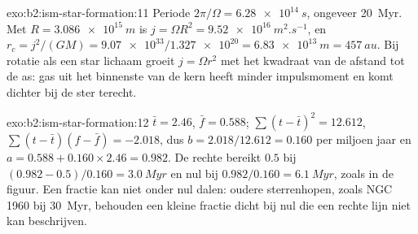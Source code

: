 \begin{solution}{exo:b2:ism-star-formation:11}
Periode $2\pi/\Omega = \qty{6.28e14}{s}$, ongeveer \qty{20}{Myr}. Met
$R = \qty{3.086e15}{m}$ is $j = \Omega R^2 = \qty{9.52e16}{m^2.s^{-1}}$, en
$r_c = j^2/(GM) = \num{9.07e33}/\num{1.327e20} = \qty{6.83e13}{m} = \qty{457}{au}$.
Bij rotatie als een star lichaam groeit $j = \Omega r^2$ met het kwadraat van de afstand tot de as:
gas uit het binnenste van de kern heeft minder impulsmoment en komt dichter bij de ster terecht.
\end{solution}

\begin{solution}{exo:b2:ism-star-formation:12}
$\bar t = 2.46$, $\bar f = 0.588$; $\sum(t - \bar t)^2 = 12.612$,
$\sum(t - \bar t)(f - \bar f) = -2.018$, dus $b = 2.018/12.612 = 0.160$ per miljoen
jaar en $a = 0.588 + 0.160\times2.46 = 0.982$. De rechte bereikt $0.5$ bij
$(0.982 - 0.5)/0.160 = \qty{3.0}{Myr}$ en nul bij $0.982/0.160 = \qty{6.1}{Myr}$, zoals in
de figuur. Een fractie kan niet onder nul dalen: oudere sterrenhopen, zoals NGC 1960 bij
\qty{30}{Myr}, behouden een kleine fractie dicht bij nul die een rechte lijn niet kan beschrijven.
\end{solution}

